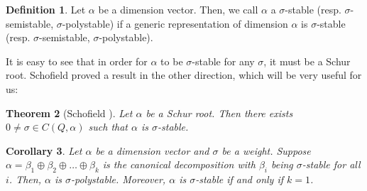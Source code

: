 \documentclass[11pt]{amsart}
\newtheorem{theorem}{Theorem}[section]
\newtheorem{corollary}[theorem]{Corollary}
\theoremstyle{definition}
\newtheorem{definition}[theorem]{Definition}
\begin{document}
\begin{definition} \label{D.sigma.stable}
Let $\alpha$ be a dimension vector. Then, we call $\alpha$ a $\sigma$-stable (resp. $\sigma$-semistable, $\sigma$-polystable) if a generic representation of dimension $\alpha$ is $\sigma$-stable (resp. $\sigma$-semistable, $\sigma$-polystable).
\end{definition}

It is easy to see that in order for $\alpha$ to be $\sigma$-stable for any $\sigma$, it must be a Schur root. Schofield proved a result in the other direction, which will be very useful for us:

\begin{theorem} [Schofield \cite{Scho-gen}] \label{Scho-schur-stable}
Let $\alpha$ be a Schur root. Then there exists $0 \neq \sigma \in C(Q,\alpha)$ such that $\alpha$ is $\sigma$-stable. 
\end{theorem}

\begin{corollary} \label{ps-not-obvious}
Let $\alpha$ be a dimension vector and $\sigma$ be a weight. Suppose $\alpha = \beta_1 \oplus \beta_2 \oplus \dots \oplus \beta_k$ is the canonical decomposition with $\beta_i$ being $\sigma$-stable for all $i$. Then, $\alpha$ is $\sigma$-polystable. Moreover, $\alpha$ is $\sigma$-stable if and only if $k = 1$.
\end{corollary}
\end{document}
